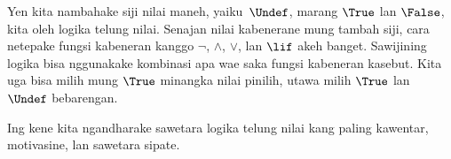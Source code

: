 \documentclass[../../../include/open-logic-section]{subfiles}
\begin{document}


Yen kita nambahake siji nilai maneh, yaiku~$\Undef$, marang
$\True$ lan $\False$, kita oleh logika telung nilai. Senajan
nilai kabenerane mung tambah siji, cara netepake fungsi kabeneran
kanggo $\lnot$, $\land$, $\lor$, lan $\lif$ akeh banget.
Sawijining logika bisa nggunakake kombinasi apa wae saka fungsi
kabeneran kasebut. Kita uga bisa milih mung $\True$ minangka
nilai pinilih, utawa milih $\True$ lan~$\Undef$ bebarengan.

Ing kene kita ngandharake sawetara logika telung nilai kang
paling kawentar, motivasine, lan sawetara sipate.
\end{document}
